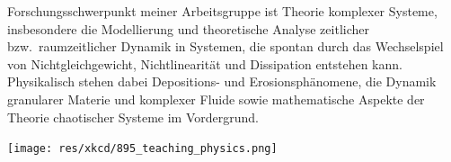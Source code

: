 \begin{multicols}{2}
Forschungsschwerpunkt meiner Arbeitsgruppe ist Theorie komplexer Systeme, insbesondere die Modellierung und theoretische Analyse zeitlicher bzw.\ raumzeitlicher Dynamik in Systemen, die spontan durch das Wechselspiel von Nichtgleichgewicht, Nichtlinearität und Dissipation entstehen kann. Physikalisch stehen dabei Depositions- und Erosionsphänomene, die Dynamik granularer Materie und komplexer Fluide sowie mathematische Aspekte der Theorie chaotischer Systeme im Vordergrund.

\end{multicols}

\begin{center}
	\texttt{[image: res/xkcd/895\_teaching\_physics.png]}
\end{center}

\medskip

\begin{center}
\end{center}

\newpage

\vspace*{\fill}

